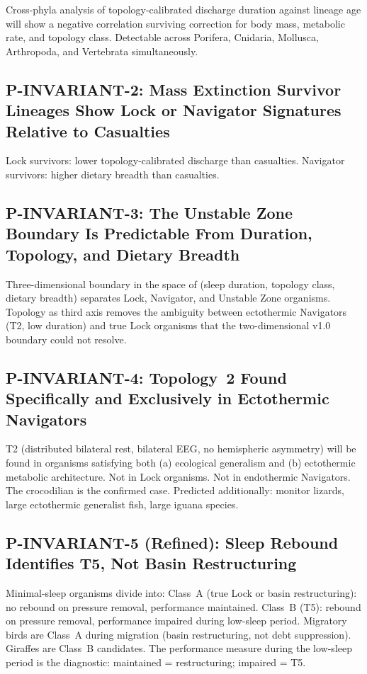 \documentclass[10pt, a4paper]{article}
\begin{document}
Cross-phyla analysis of topology-calibrated
discharge duration against lineage age
will show a negative correlation surviving
correction for body mass, metabolic rate,
and topology class. Detectable across
Porifera, Cnidaria, Mollusca, Arthropoda,
and Vertebrata simultaneously.

\subsection{P-INVARIANT-2: Mass Extinction
Survivor Lineages Show Lock or Navigator
Signatures Relative to Casualties}

Lock survivors: lower topology-calibrated
discharge than casualties. Navigator
survivors: higher dietary breadth than
casualties.

\subsection{P-INVARIANT-3: The Unstable
Zone Boundary Is Predictable From
Duration, Topology, and Dietary Breadth}

Three-dimensional boundary in the space
of (sleep duration, topology class,
dietary breadth) separates Lock, Navigator,
and Unstable Zone organisms. Topology as
third axis removes the ambiguity between
ectothermic Navigators (T2, low duration)
and true Lock organisms that the
two-dimensional v1.0 boundary could
not resolve.

\subsection{P-INVARIANT-4: Topology~2
Found Specifically and Exclusively in
Ectothermic Navigators}

T2 (distributed bilateral rest, bilateral
EEG, no hemispheric asymmetry) will be
found in organisms satisfying both (a)
ecological generalism and (b) ectothermic
metabolic architecture. Not in Lock
organisms. Not in endothermic Navigators.
The crocodilian is the confirmed case.
Predicted additionally: monitor lizards,
large ectothermic generalist fish,
large iguana species.

\subsection{P-INVARIANT-5 (Refined):
Sleep Rebound Identifies T5, Not Basin
Restructuring}

Minimal-sleep organisms divide into:
Class~A (true Lock or basin restructuring):
no rebound on pressure removal, performance
maintained.
Class~B (T5): rebound on pressure removal,
performance impaired during low-sleep
period.
Migratory birds are Class~A during
migration (basin restructuring, not debt
suppression). Giraffes are Class~B
candidates. The performance measure
during the low-sleep period is the
diagnostic: maintained = restructuring;
impaired = T5.
\end{document}
